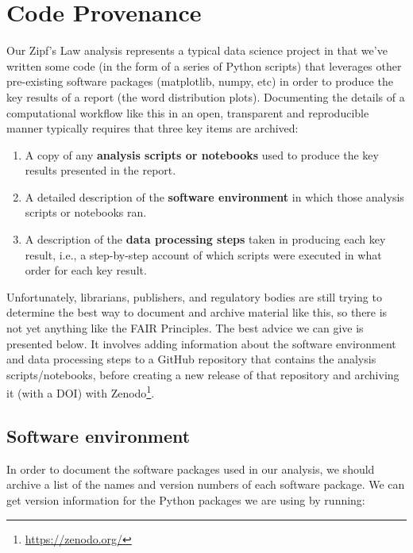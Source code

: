 \documentclass[
]{krantz}
\providecommand{\tightlist}{%
  \setlength{\itemsep}{0pt}\setlength{\parskip}{0pt}}
\renewcommand{\href}[2]{#2\footnote{\url{#1}}}
\begin{document}
\hypertarget{provenance-code}{%
\section{Code Provenance}\label{provenance-code}}

Our Zipf's Law analysis represents a typical data science project
in that we've written some code (in the form of a series of Python scripts)
that leverages other pre-existing software packages (matplotlib, numpy, etc)
in order to produce the key results of a report (the word distribution plots).
Documenting the details of a computational workflow like this
in an open, transparent and reproducible manner
typically requires that three key items are archived:

\begin{enumerate}
\def\labelenumi{\arabic{enumi}.}
\tightlist
\item
  A copy of any \textbf{analysis scripts or notebooks} used to produce the key results
  presented in the report.
\item
  A detailed description of the \textbf{software environment}
  in which those analysis scripts or notebooks ran.
\item
  A description of the \textbf{data processing steps} taken in producing each key result,
  i.e., a step-by-step account of which scripts were executed in what order
  for each key result.
\end{enumerate}

Unfortunately,
librarians, publishers, and regulatory bodies are still trying to determine
the best way to document and archive material like this,
so there is not yet anything like the FAIR Principles.
The best advice we can give is presented below.
It involves adding information about the software environment
and data processing steps to a GitHub repository that contains
the analysis scripts/notebooks,
before creating a new release of that repository and archiving it (with a DOI)
with \href{https://zenodo.org/}{Zenodo}.

\hypertarget{provenance-code-environment}{%
\subsection{Software environment}\label{provenance-code-environment}}

In order to document the software packages used in our analysis,
we should archive a list of the names and version numbers of each software package.
We can get version information for the Python packages we are using by running:
\end{document}
